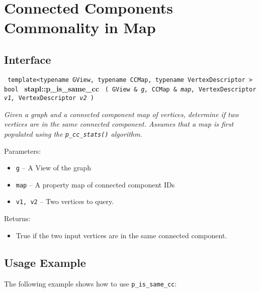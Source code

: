 
\section{ Connected Components Commonality in Map}
\label{sec-p-is-same-cc-alg}

\subsection{Interface} \label{sec-p-is-same-cc-alg-inter}

\noindent
\texttt{%
template<typename GView, typename CCMap, typename VertexDescriptor >
\newline
bool 
}
\newline
\textbf{stapl::p\_is\_same\_cc}%
\newline
\texttt{%
(
GView \&
\textit{g,}%
CCMap \&
\textit{map,}%
VertexDescriptor
\textit{v1,}%
VertexDescriptor
\textit{v2}%
)     
}
\vspace{0.4cm}

\textit{
Given a graph and a connected component map of vertices, determine if two vertices are in the same connected component.
Assumes that a map is first populated using the 
\texttt{p\_cc\_stats()}%
algorithm.
}
\vspace{0.4cm}

Parameters:
\begin{itemize}
\item
\texttt{g} --
A View of the graph
\item
\texttt{map} --
A property map of connected component IDs
\item
\texttt{v1, v2} --
Two vertices to query.
\end{itemize}

Returns:
\begin{itemize}
\item
True if the two input vertices are in the same connected component. 
\end{itemize}

\subsection{Usage Example} \label{sec-p-is-same-cc-alg-use}

The following example shows how to use 
\texttt{p\_is\_same\_cc}:


